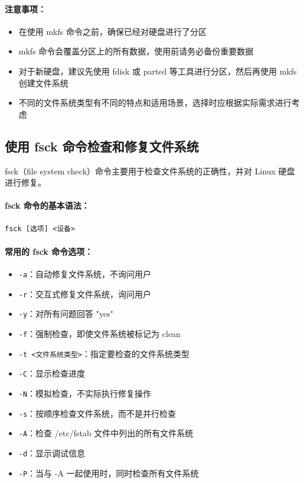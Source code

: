\documentclass[12pt,UTF8]{ctexbook}
\begin{document}
\paragraph{注意事项：}
\begin{itemize}
    \item 在使用 mkfs 命令之前，确保已经对硬盘进行了分区
    \item mkfs 命令会覆盖分区上的所有数据，使用前请务必备份重要数据
    \item 对于新硬盘，建议先使用 fdisk 或 parted 等工具进行分区，然后再使用 mkfs 创建文件系统
    \item 不同的文件系统类型有不同的特点和适用场景，选择时应根据实际需求进行考虑
\end{itemize}

\subsection{使用 fsck 命令检查和修复文件系统}
fsck（file system check）命令主要用于检查文件系统的正确性，并对 Linux 硬盘进行修复。

\paragraph{fsck 命令的基本语法：}
\begin{verbatim}
fsck [选项] <设备>
\end{verbatim}

\paragraph{常用的 fsck 命令选项：}
\begin{itemize}
    \item \verb+-a+：自动修复文件系统，不询问用户
    \item \verb+-r+：交互式修复文件系统，询问用户
    \item \verb+-y+：对所有问题回答 "yes"
    \item \verb+-f+：强制检查，即使文件系统被标记为 clean
    \item \verb+-t <文件系统类型>+：指定要检查的文件系统类型
    \item \verb+-C+：显示检查进度
    \item \verb+-N+：模拟检查，不实际执行修复操作
    \item \verb+-s+：按顺序检查文件系统，而不是并行检查
    \item \verb+-A+：检查 /etc/fstab 文件中列出的所有文件系统
    \item \verb+-d+：显示调试信息
    \item \verb+-P+：当与 -A 一起使用时，同时检查所有文件系统
\end{itemize}
\end{document}
